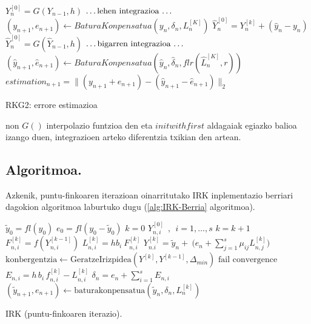 \begin{algorithm}[h]
  \BlankLine
  {
    \BlankLine
    $Y_n^{[0]}=G(Y_{n-1},h)$\;
    \BlankLine
    $\text{\dots lehen integrazioa \dots}$\;
	\BlankLine
    $(y_{n+1},e_{n+1})\leftarrow BaturaKonpensatua(y_n,\delta_n,L_n^{[K]})$\;      
    \BlankLine
    \BlankLine
    {$\hat{Y}_{n}^{[0]}=Y_{n}^{[k]}+(\hat{y}_n-y_n)$\;}
    {$\hat{Y}_{n}^{[0]}=G(\hat{Y}_{n-1},h)$\;}
    \BlankLine
    $\text{\dots bigarren integrazioa \dots}$\;
	\BlankLine
    $(\hat{y}_{n+1},\hat{e}_{n+1})\leftarrow BaturaKonpensatua(\hat{y}_n,\hat{\delta}_n,flr(\hat{L}_n^{[K]},r))$\;  
    \BlankLine
    \BlankLine
    $estimation_{n+1}=\|(y_{n+1}+e_{n+1})-(\hat{y}_{n+1}-\hat{e}_{n+1})\|_2$\;
    \BlankLine
   }
 \caption{RKG2: errore estimazioa}
 \label{alg:errore-estimazioa}
\end{algorithm}
non $G()$ interpolazio funtzioa den eta $initwithfirst$ aldagaiak egiazko balioa izango duen, integrazioen arteko diferentzia txikian den artean.

\subsection{Algoritmoa.}

Azkenik, puntu-finkoaren iterazioan oinarritutako IRK inplementazio berriari dagokion algoritmoa laburtuko dugu (\ref{alg:IRK-Berria} algoritmoa).

\begin{algorithm}[H]
 \BlankLine
  $\tilde{y}_0=fl(y_0)$\;
  $e_0=fl(y_0-\tilde{y}_0)$\;
  {
   \BlankLine
   $k=0$\;
     $Y_{n,i}^{[0]} \ \ , \ \ i=1,\dots,s $\;
   \BlankLine
   {
    \BlankLine 
    $k=k+1$\;
    $F_{n,i}^{[k]}=f(Y_{n,i}^{[k-1]}) $\;
    $L_{n,i}^{[k]}=hb_i \ F_{n,i}^{[k]} $\;
    $Y_{n.i}^{[k]}=\tilde{y}_{n} + \ \big(e_n+\sum\limits_{j=1}^{s} \mu_{ij} L_{n,j}^{[k]}\big)  $\;  
    $\text{konbergentzia} \leftarrow \text{GeratzeIrizpidea}(Y^{[k]},Y^{[k-1]},\Delta_{min}) $\;
   }
   \BlankLine
   {
   {$\text{fail convergence}$\;}
   }
   $E_{n,i} = h\,   b_i\,f_{n,i}^{[k]}-L_{n,i}^{[k]}$\;
   $\delta_{n}=e_{n}+\sum_{i=1}^{s} E_{n,i}$\;
   $(\tilde y_{n+1}, e_{n+1})\leftarrow \text{baturakonpensatua}(\tilde y_{n},\delta_{n},L_{n}^{[k]})$\;
   \BlankLine
 }
 \caption{IRK (puntu-finkoaren iterazio).}
 \label{alg:IRK-Berria}
\end{algorithm}

